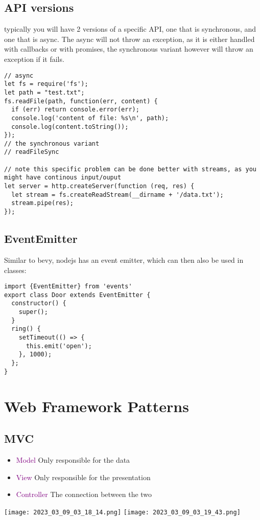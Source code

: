 \documentclass[main.tex,fontsize=8pt,paper=a4,paper=portrait,DIV=calc,]{scrartcl}
\begin{document}
\subsection{API versions}
typically you will have 2 versions of a specific API, one that is synchronous, and one that is async.\newline
The async will not throw an exception, as it is either handled with callbacks or with promises, the synchronous variant however will throw an exception if it fails.\newline
\begin{lstlisting}
// async
let fs = require('fs');
let path = "test.txt";
fs.readFile(path, function(err, content) {
  if (err) return console.error(err);
  console.log('content of file: %s\n', path);
  console.log(content.toString());
});
// the synchronous variant 
// readFileSync

// note this specific problem can be done better with streams, as you might have continous input/ouput
let server = http.createServer(function (req, res) {
  let stream = fs.createReadStream(__dirname + '/data.txt');
  stream.pipe(res);
});
\end{lstlisting}

\subsection{EventEmitter}
Similar to bevy, nodejs has an event emitter, which can then also be used in classes:\newline
\begin{lstlisting}
import {EventEmitter} from 'events'
export class Door extends EventEmitter {
  constructor() {
    super();
  }
  ring() {
    setTimeout(() => {
      this.emit('open');
    }, 1000);
  };
}
\end{lstlisting}


\section{Web Framework Patterns}

\subsection{MVC}
\begin{itemize}
\item \textcolor{purple}{Model}\newline
  Only responsible for the data
\item \textcolor{purple}{View}\newline
  Only responsible for the presentation
\item \textcolor{purple}{Controller}\newline
  The connection between the two
\end{itemize} 
\texttt{[image: 2023\_03\_09\_03\_18\_14.png]}
\texttt{[image: 2023\_03\_09\_03\_19\_43.png]}
\end{document}
